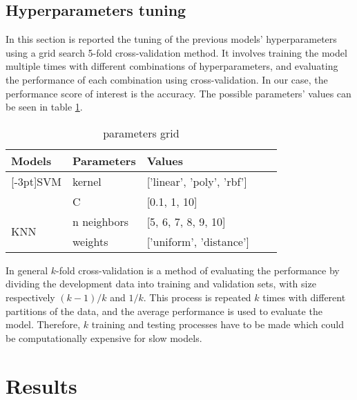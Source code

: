 \documentclass[conference]{IEEEtran}
\begin{document}
\subsection{Hyperparameters tuning}
In this section is reported the tuning of the previous models' hyperparameters using a grid search 5-fold cross-validation method.
It involves training the model multiple times with different combinations of hyperparameters, and evaluating the performance of each combination using cross-validation.
In our case, the performance score of interest is the accuracy.
The possible parameters' values can be seen in table \ref{tab:grid}.

\begin{table}
    \centering
    \caption{parameters grid}
    \begin{tabular}{lllll}
        \toprule
        \toprule
        Models & Parameters & Values\\
        \midrule
        \addlinespace[5pt]
        \multirow{2}{*}[-3pt]{SVM}  & kernel & ['linear', 'poly', 'rbf']\\
                                    \cmidrule{2-3}
                                    & C      & [0.1, 1, 10]\\
        \midrule
        \multirow{2}{*}[-3pt]{KNN}  & n neighbors & [5, 6, 7, 8, 9, 10]\\
                                    \cmidrule{2-3}
                                    & weights     & ['uniform', 'distance']\\
        \bottomrule
    \end{tabular}
    \label{tab:grid}
\end{table}

In general $k$-fold cross-validation is a method of evaluating the performance by dividing the development data into training and validation sets, with size respectively $(k-1)/k$ and $1/k$.
This process is repeated $k$ times with different partitions of the data, and the average performance is used to evaluate the model.
Therefore, $k$ training and testing processes have to be made which could be computationally expensive for slow models.

\section{Results}
\end{document}
